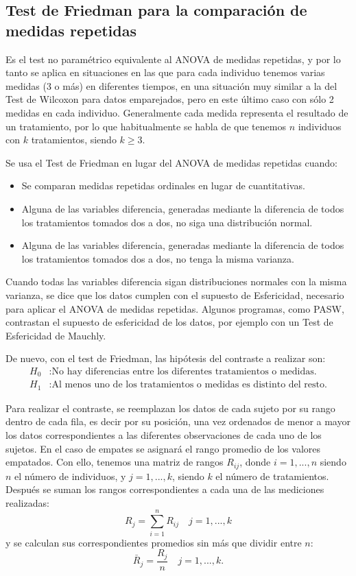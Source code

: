 \begin{description}
\subsection{Test de Friedman para la comparación de medidas repetidas}

Es el test no paramétrico equivalente al ANOVA de medidas repetidas, y por lo tanto se aplica en situaciones en las que para cada individuo tenemos varias medidas (3 o más) en diferentes tiempos, en una situación muy similar a la del Test de Wilcoxon para datos emparejados, pero en este último caso con sólo 2 medidas en cada individuo. Generalmente cada medida representa el resultado de un tratamiento, por lo que habitualmente se habla de que tenemos $n$ individuos con $k$ tratamientos, siendo $k\geq3$.

Se usa el Test de Friedman en lugar del ANOVA de medidas repetidas cuando:

\begin{itemize}
\item Se comparan medidas repetidas ordinales en lugar de cuantitativas.
\item Alguna de las variables diferencia, generadas mediante la diferencia de todos los tratamientos tomados dos a dos, no siga una distribución normal.
\item Alguna de las variables diferencia, generadas mediante la diferencia de todos los tratamientos tomados dos a dos, no tenga la misma varianza.
\end{itemize}

Cuando todas las variables diferencia sigan distribuciones normales con la misma varianza, se dice que los datos cumplen con el supuesto de Esfericidad, necesario para aplicar el ANOVA de medidas repetidas. Algunos programas, como PASW, contrastan el supuesto de esfericidad de los datos, por ejemplo con un Test de Esfericidad de Mauchly.

De nuevo, con el test de Friedman, las hipótesis del contraste a realizar son:
\begin{align*}
H_0 &: \textrm{No hay diferencias entre los diferentes tratamientos o medidas.}\\
H_1 &: \textrm{Al menos uno de los tratamientos o medidas es distinto del resto.}
\end{align*}

Para realizar el contraste, se reemplazan los datos de cada sujeto por su rango dentro de cada fila, es decir por su posición, una vez ordenados de menor a mayor los datos correspondientes a las diferentes observaciones de cada uno de los sujetos. En el caso de empates se asignará el rango promedio de los valores empatados. Con ello, tenemos una matriz de rangos $R_{ij}$, donde $i=1,...,n$ siendo $n$ el número de individuos, y $j=1,...,k$, siendo $k$ el número de tratamientos. Después se suman los rangos correspondientes a cada una de las mediciones realizadas:
\[
R_j = \sum_{i=1}^n R_{ij} \quad j = 1,...,k
\]
y se calculan sus correspondientes promedios sin más que dividir entre $n$:
\[
\bar R_j = \frac{R_j}{n} \quad j = 1,...,k.
\]


\end{description}

